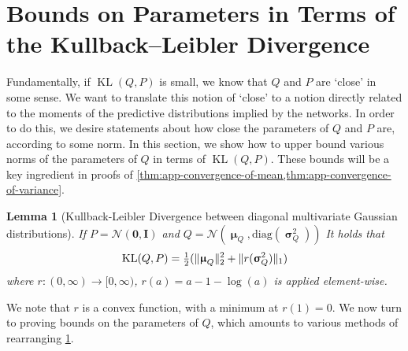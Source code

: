 \documentclass[twoside]{article}
\newcommand{\vnull}{\mathbf{0}}
\newcommand{\vmu}{\bm{\upmu}}
\newcommand{\vsigma}{\bm{\upsigma}}
\newcommand{\mI}{\mathbf{I}}
\renewcommand{\P}{\mathbb{P}}
\newcommand{\Q}{\mathbb{Q}}
\renewcommand{\Q}{\ensuremath{Q}}
\renewcommand{\P}{\ensuremath{P}}
\newcommand{\KL}{\operatorname{KL}}
\newcommand{\Normal}{\mathcal{N}}
\DeclarePairedDelimiter\norm{\|}{\|}             %
\theoremstyle{theoremstyle}
\newtheorem{lemma}[theorem]{Lemma}
\begin{document}
\section{Bounds on Parameters in Terms of the Kullback--Leibler Divergence}\label{app:parameter-bounds}
Fundamentally, if $\KL(\Q,\P)$ is small, we know that $\Q$ and $\P$ are `close' in some sense. We want to translate this notion of `close' to a notion directly related to the moments of the predictive distributions implied by the networks. In order to do this, we desire statements about how close the parameters of $\Q$ and $\P$ are, according to some norm. In this section, we show how to upper bound various norms of the parameters of $\Q$ in terms of $\KL(\Q,\P)$. These bounds will be a key ingredient in proofs of \cref{thm:app-convergence-of-mean,thm:app-convergence-of-variance}.

\begin{lemma}[Kullback-Leibler Divergence between diagonal multivariate Gaussian distributions]\label{lem:gaussian-kl}
If $P=\Normal(\vnull,\mI)$ and $Q = \Normal(\vmu_Q, \mathrm{diag}(\vsigma^2_Q))$ It holds that
    \begin{equation}
        \KL(\Q, \P)
        =
            \tfrac{1}{2}
            (\norm{\vmu_Q}_2^2 + \norm{r(\vsigma^2_Q)}_1)
    \end{equation}
    where $r\colon (0, \infty) \to [0, \infty)$, $r(a) = a - 1 - \log(a)$ is applied element-wise.
\end{lemma}
We note that $r$ is a convex function, with a minimum at $r(1)=0$. We now turn to proving bounds on the parameters of $\Q$, which amounts to various methods of rearranging \cref{lem:gaussian-kl}.
\end{document}
